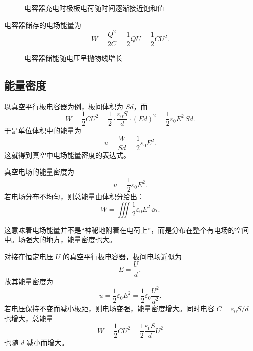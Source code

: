 \begin{figure}[htbp]
\centering
{}
\caption{电容器充电时极板电荷随时间逐渐接近饱和值}
\end{figure}

\begin{law}
电容器储存的电场能量为
\[
W=\frac{Q^2}{2C}=\frac{1}{2}QU=\frac{1}{2}CU^2.
\]
\end{law}

\begin{figure}[htbp]
\centering
{}
\caption{电容器储能随电压呈抛物线增长}
\end{figure}

\subsection{能量密度}

以真空平行板电容器为例，板间体积为 $Sd$，而
\[
W=\frac{1}{2}CU^2=\frac{1}{2}\cdot \frac{\varepsilon_0 S}{d}\cdot (Ed)^2
=\frac{1}{2}\varepsilon_0 E^2\,Sd.
\]
于是单位体积中的能量为
\[
u=\frac{W}{Sd}=\frac{1}{2}\varepsilon_0 E^2.
\]
这就得到真空中电场能量密度的表达式。

\begin{law}
真空电场的能量密度为
\[
u=\frac{1}{2}\varepsilon_0 E^2.
\]
若电场分布不均匀，则总能量由体积分给出：
\[
W=\iiint \frac{1}{2}\varepsilon_0 E^2\,\dd \tau.
\]
\end{law}

这意味着电场能量并不是“神秘地附着在电荷上”，而是分布在整个有电场的空间中。场强大的地方，能量密度也大。

对接在恒定电压 $U$ 的真空平行板电容器，板间电场近似为
\[
E=\frac{U}{d},
\]
故其能量密度为
\[
u=\frac{1}{2}\varepsilon_0 E^2=\frac{1}{2}\varepsilon_0\frac{U^2}{d^2}.
\]
若电压保持不变而减小板距，则电场变强，能量密度增大。同时电容 $C=\varepsilon_0 S/d$ 也增大，总能量
\[
W=\frac{1}{2}CU^2=\frac{1}{2}\frac{\varepsilon_0 S}{d}U^2
\]
也随 $d$ 减小而增大。

